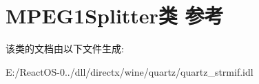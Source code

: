\hypertarget{class_m_p_e_g1_splitter}{}\section{M\+P\+E\+G1\+Splitter类 参考}
\label{class_m_p_e_g1_splitter}


该类的文档由以下文件生成\+:\begin{DoxyCompactItemize}
\item 
E\+:/\+React\+O\+S-\/0../dll/directx/wine/quartz/quartz\+\_\+strmif.\+idl\end{DoxyCompactItemize}
